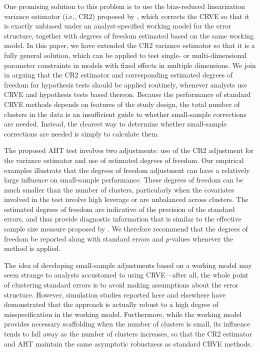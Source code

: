 \documentclass[12pt]{article}\usepackage[]{graphicx}\usepackage[]{color}
\newcommand{\bs}{\boldsymbol}
\begin{document}
One promising solution to this problem is to use the bias-reduced linearization variance estimator (i.e., CR2) proposed by \citet{Bell2002bias}, which corrects the CRVE so that it is exactly unbiased under an analyst-specified working model for the error structure, together with degrees of freedom estimated based on the same working model.
In this paper, we have extended the CR2 variance estimator so that it is a fully general solution, which can be applied to test single- or multi-dimensional parameter constraints in models with fixed effects in multiple dimensions. 
We join \citet{Imbens2015robust} in arguing that the CR2 estimator and corresponding estimated degrees of freedom for hypothesis tests should be applied routinely, whenever analysts use CRVE and hypothesis tests based thereon. 
Because the performance of standard CRVE methods depends on features of the study design, the total number of clusters in the data is an insufficient guide to whether small-sample corrections are needed. 
Instead, the clearest way to determine whether small-sample corrections are needed is simply to calculate them.

The proposed AHT test involves two adjustments: use of the CR2 adjustment for the variance estimator and use of estimated degrees of freedom. 
Our empirical examples illustrate that the degrees of freedom adjustment can have a relatively large influence on small-sample performance.
These degrees of freedom can be much smaller than the number of clusters, particularly when the covariates involved in the test involve high leverage or are unbalanced across clusters.
The estimated degrees of freedom are indicative of the precision of the standard errors, and thus provide diagnostic information that is similar to the effective sample size measure proposed by \citet{Carter2013asymptotic}. 
We therefore recommend that the degrees of freedom be reported along with standard errors and $p$-values whenever the method is applied.

The idea of developing small-sample adjustments based on a working model may seem strange to analysts accustomed to using CRVE---after all, the whole point of clustering standard errors is to avoid making assumptions about the error structure.
However, simulation studies reported here and elsewhere  have demonstrated that the approach is actually robust to a high degree of misspecification in the working model. 
Furthermore, while the working model provides necessary scaffolding when the number of clusters is small, its  influence tends to fall away as the number of clusters increases, so that the CR2 estimator and AHT maintain the same asymptotic robustness as standard CRVE methods. 
\end{document}
